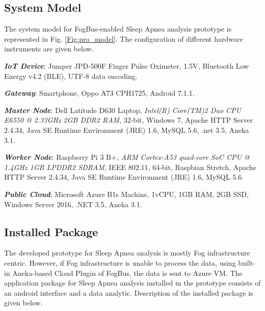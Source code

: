 \documentclass[final,5p,times,twocolumn]{elsarticle}
\begin{document}
\subsection{System Model} \label{model}
The system model for FogBus-enabled Sleep Apnea analysis prototype is represented in Fig. \ref{Fig:pro_model}. The configuration of different hardware instruments are given below.   
\par \textbf{\textit{IoT Device}}: Jumper JPD-500F Finger Pulse Oximeter, 1.5V, Bluetooth Low Energy v4.2 (BLE), UTF-8 data encoding. 
\par \textbf{\textit{Gateway}}: Smartphone, Oppo A73 CPH1725, Android 7.1.1. 
\par \textbf{\textit{Master Node}}: Dell Latitude D630 Laptop, \textit{Intel(R) Core(TM)2 Duo CPU
E6550 @ 2.33GHz 2GB DDR2 RAM}, 32-bit, Windows 7, Apache HTTP Server 2.4.34, Java SE Runtime Environment (JRE) 1.6, MySQL 5.6, .net 3.5, Aneka 3.1.   
\par \textbf{\textit{Worker Node}}: Raspberry Pi 3 B+, \textit{ARM Cortex-A53 quad-core SoC CPU @ 1.4GHz 1GB LPDDR2 SDRAM}, IEEE 802.11, 64-bit, Raspbian Stretch, Apache HTTP Server 2.4.34, Java SE Runtime Environment (JRE) 1.6, MySQL 5.6. 
\par \textbf{\textit{Public Cloud}}: Microsoft Azure B1s Machine, 1vCPU, 1GB RAM, 2GB SSD, Windows Server 2016, .NET 3.5, Aneka 3.1. 
%
\subsection{Installed Package}
The developed prototype for Sleep Apnea analysis is mostly Fog infrastructure centric. However, if Fog infrastructure is unable to process the data, using built-in Aneka-based Cloud Plugin of FogBus, the data is sent to Azure VM. The application package for Sleep Apnea analysis installed in the prototype consists of an android interface and a data analytic. Description of the installed package is given below.     
%
\end{document}
